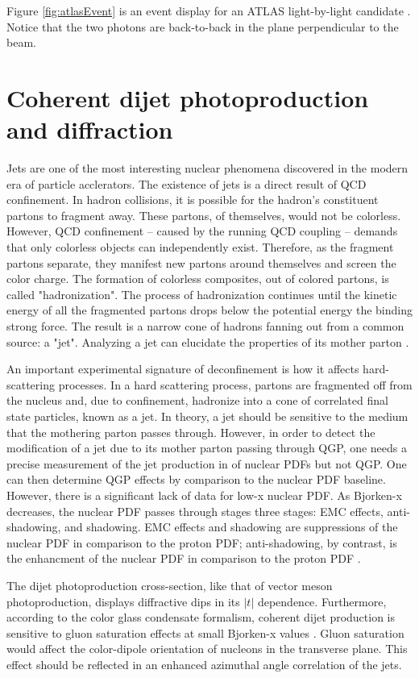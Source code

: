 Figure \ref{fig:atlasEvent} is an event display for an ATLAS light-by-light candidate \cite{Collaboration:2278547}. Notice that the two photons are back-to-back in the plane perpendicular to the beam.

\section{Coherent dijet photoproduction and diffraction}

Jets are one of the most interesting nuclear phenomena discovered in the modern era of particle acclerators. The existence of jets is a direct result of QCD confinement. In hadron collisions, it is possible for the hadron's constituent partons to fragment away. These partons, of themselves, would not be colorless. However, QCD confinement -- caused by the running QCD coupling -- demands that only colorless objects can independently exist. Therefore, as the fragment partons separate, they manifest new partons around themselves and screen the color charge. The formation of colorless composites, out of colored partons, is called "hadronization". The process of hadronization continues until the kinetic energy of all the fragmented partons drops below the potential energy the binding strong force. The result is a narrow cone of hadrons fanning out from a common source: a "jet". Analyzing a jet can elucidate the properties of its mother parton \cite{d'Enterria:2004nv}.  

An important experimental signature of deconfinement is how it affects hard-scattering processes. In a hard scattering process, partons are fragmented off from the nucleus and, due to confinement, hadronize into a cone of correlated final state particles, known as a jet. In theory, a jet should be sensitive to the medium that the mothering parton passes through. However, in order to detect the modification of a jet due to its mother parton passing through QGP, one needs a precise measurement of the jet production in of nuclear PDFs but not QGP. One can then determine QGP effects by comparison to the nuclear PDF baseline. However, there is a significant lack of data for low-x nuclear PDF. As Bjorken-x decreases, the nuclear PDF passes through stages three stages: EMC effects, anti-shadowing, and shadowing. EMC effects and shadowing are suppressions of the nuclear PDF in comparison to the proton PDF; anti-shadowing, by contrast, is the enhancment of the nuclear PDF in comparison to the proton PDF \cite{Strikman:2005yv}. 

The dijet photoproduction cross-section, like that of vector meson photoproduction, displays diffractive dips in its $|t|$ dependence. Furthermore, according to the color glass condensate formalism, coherent dijet production is sensitive to gluon saturation effects at small Bjorken-x values \cite{Guzey:2016awf}\cite{Guzey:2016tek}. Gluon saturation would affect the color-dipole orientation of nucleons in the transverse plane. This effect should be reflected in an enhanced azimuthal angle correlation of the jets. 

